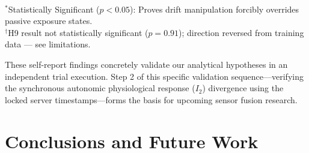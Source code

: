 \documentclass[11pt, a4paper]{report}
\begin{document}
    \begin{table}[H]
    \centering
    \small
    \caption{Phase 5 Independent Clinical Validation Results (Self-Report Survey Analysis)}
    \label{tab:phase5-validation-stats}
    \vspace{1ex}
    \\ \small{$^*$Statistically Significant ($p < 0.05$): Proves drift manipulation forcibly overrides passive exposure states.}
    \\ \small{$^\dag$H9 result not statistically significant ($p = 0.91$); direction reversed from training data --- see limitations.}
\end{table}

These self-report findings concretely validate our analytical hypotheses in an independent trial execution. Step 2 of this specific validation sequence---verifying the synchronous autonomic physiological response ($I_2$) divergence using the locked server timestamps---forms the basis for upcoming sensor fusion research.


\chapter{Conclusions and Future Work}
\label{chap:conclusion}
\end{document}
